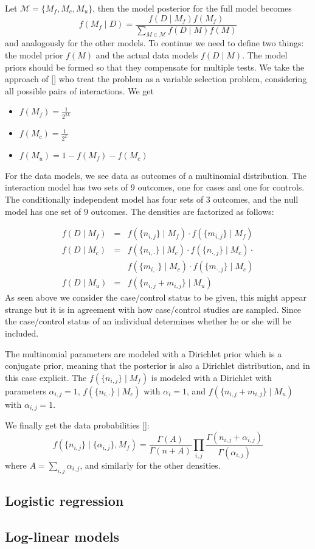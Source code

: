 \documentclass{bioinfo}
\begin{document}
\begin{methods}
Let $\mathcal{M} = \{ M_f, M_c, M_u \}$, then the model posterior for the full model becomes
$$ f(M_f \mid D) = \frac{f(D \mid M_f)f(M_f)}{\sum_{M \in \mathcal{M}}f(D \mid M)f(M)}$$
and analogously for the other models. To continue we need to define two things: the model prior $f(M)$ and the actual data models $f(D \mid M)$. The model priors should be formed so that they compensate for multiple tests. We take the approach of [] who treat the problem as a variable selection problem, considering all possible pairs of interactions. We get
\begin{itemize}
\item $f(M_f) = \frac{1}{2^{2L}}$
\item $f(M_c) = \frac{1}{2^{L}}$
\item $f(M_u) = 1 - f(M_f) - f(M_c)$
\end{itemize}
For the data models, we see data as outcomes of a multinomial distribution. The interaction model has two sets of $9$ outcomes, one for cases and one for controls. The conditionally independent model has four sets of $3$ outcomes, and the null model has one set of $9$ outcomes. The densities are factorized as follows:

\begin{eqnarray*}
	f(D \mid M_f)  & = & f( \{ n_{i,j} \} \mid M_f) \cdot f( \{ m_{i,j} \} \mid M_f)\\
	f(D \mid M_c) & = & f( \{ n_{i,\cdot} \} \mid M_c) \cdot f( \{ n_{\cdot, j} \} \mid M_c) \cdot \\
	& & f(\{ m_{i,\cdot} \} \mid M_c) \cdot f( \{ m_{\cdot,j} \} \mid M_c) \\
	f(D \mid M_u) & = & f( \{ n_{i,j} + m_{i,j} \} \mid M_u)
\end{eqnarray*}
As seen above we consider the case/control status to be given, this might appear strange but it is in agreement with how case/control studies are sampled. Since the case/control status of an individual determines whether he or she will be included.

The multinomial parameters are modeled with a Dirichlet prior which is a conjugate prior, meaning that the posterior is also a Dirichlet distribution, and in this case explicit. The $f( \{ n_{i,j} \} \mid M_f)$ is modeled with a Dirichlet with parameters $\alpha_{i,j}= 1$, $f( \{ n_{i,\cdot} \} \mid M_c)$ with $\alpha_i = 1$, and $f( \{ n_{i,j} + m_{i,j} \} \mid M_u)$ with $\alpha_{i,j} = 1$.

We finally get the data probabilities []:
$$ f( \{n_{i,j}\} \mid \{ \alpha_{i,j} \}, M_f) = \frac{ \Gamma \left( A \right) }{ \Gamma\left( n + A \right) } \prod_{i,j} \frac{ \Gamma( n_{i,j} + \alpha_{i,j} ) }{ \Gamma( \alpha_{i,j} ) } $$
where $A = \sum_{i,j} \alpha_{i,j}$, and similarly for the other densities.

\subsection{Logistic regression}
\subsection{Log-linear models}
\end{methods}
\end{document}
